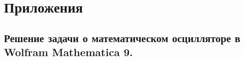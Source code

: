 \documentclass[a4paper,14pt]{article}
\begin{document}

\tableofcontents
\newpage










\newpage
\section{Приложения}
\subsection{Решение задачи о математическом осцилляторе в Wolfram Mathematica 9.}
\label{Wolfram}

\end{document}

